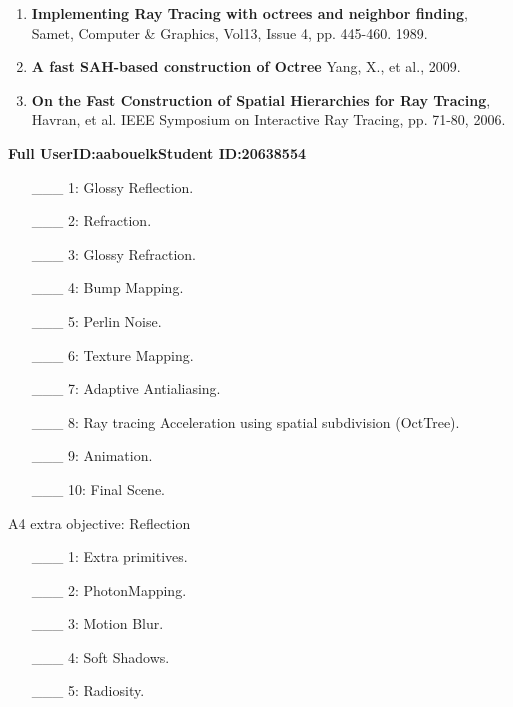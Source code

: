 \documentclass {article}
\begin{document}
\begin{description}
\begin{enumerate}
	\item {\bf Implementing Ray Tracing with octrees and neighbor finding}, Samet, Computer \& Graphics, Vol13, Issue 4, pp. 445-460. 1989.
	
	\item {\bf A fast SAH-based construction of Octree} Yang, X., et al., 2009.
	
	\item {\bf On the Fast Construction of Spatial Hierarchies for Ray Tracing}, Havran, et al. IEEE Symposium on Interactive Ray Tracing, pp. 71-80, 2006.
	
     \end{enumerate}

\end{description}
\newpage



{\hfill{\bf Full UserID:aabouelk}\hfill{\bf Student ID:20638554}\hfill}

\begin{enumerate}
     \item[\_\_\_ 1:]  Glossy Reflection.

     \item[\_\_\_ 2:]  Refraction.

     \item[\_\_\_ 3:]  Glossy Refraction.

     \item[\_\_\_ 4:]  Bump Mapping.

     \item[\_\_\_ 5:]  Perlin Noise.

     \item[\_\_\_ 6:]  Texture Mapping.

     \item[\_\_\_ 7:]  Adaptive Antialiasing.

     \item[\_\_\_ 8:]  Ray tracing Acceleration using spatial subdivision (OctTree).

     \item[\_\_\_ 9:]  Animation.
     
     \item[\_\_\_ 10:]  Final Scene.

\end{enumerate}

 A4 extra objective: Reflection\\
 
 \begin{enumerate}
     \item[\_\_\_ 1:]  Extra primitives.

     \item[\_\_\_ 2:]  PhotonMapping.

     \item[\_\_\_ 3:]  Motion Blur.

     \item[\_\_\_ 4:]  Soft Shadows.

     \item[\_\_\_ 5:]  Radiosity.
\end{enumerate}

 
\end{document}
